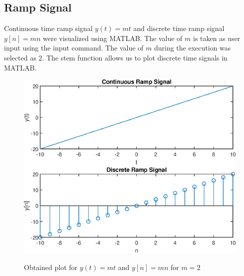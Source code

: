 \documentclass{lab_sheet}
\begin{document}
    \subsection{Ramp Signal}
    Continuous time ramp signal $y(t)=mt$ and discrete time ramp signal $y[n]=mn$ were visualized using MATLAB. The value of $m$ is taken as user input using the input command. The value of $m$ during the execution was selected as 2. The stem function allows us to plot discrete time signals in MATLAB.
    \begin{figure}[H]
        \centering
        \includegraphics[scale=0.6]{./Figures/ramp}
        \label{fig:ramp}
        \caption{Obtained plot for $y(t)=mt$ and $y[n]=mn$ for $m=2$}
    \end{figure}
    
\end{document}
